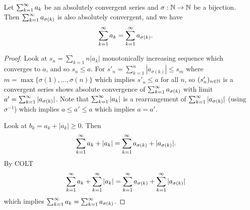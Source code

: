 \documentclass[10pt, a4paper]{article}
\newcommand{\seq}[1][x]{(#1_n)_{n \in \N}}
\begin{document}
\begin{theorem}
    Let $\infsum a_k$ be an absolutely convergent series and $\sigma : \N \rightarrow \N$ be a bijection.
    Then $\infsum a_{\sigma (k)}$ is also absolutely convergent,
    and we have
    \[
    \infsum a_k = \infsum a_{\sigma(k)}.
    \]
    \begin{proof}
        Look at $s_n = \sum_{k = 1}{n}|a_k|$ monotonically increasing sequence which converges to $a$,
        and so $s_n \leq a$.
        For $s'_n = \sum_{k = 1}^{n}|a_{\sigma(k)}| \leq s_m$ where $m = \max\{\sigma(1), \dotsc, \sigma(n)\}$ which implies $s'_n \leq a$ for all $n$,
        so $\seq[s']$ is a convergent series shows absolute convergence of $\infsum a_{\sigma(k)}$ with limit $a' = \infsum|a_{\sigma(k)}|$.
        Note that $\infsum|a_k|$ is a rearrangement of $\infsum|a_{\sigma(k)}|$
        (using $\sigma ^ {-1}$) which implies $a \leq a' \leq a$ which implies $a = a'$.

        Look at $b_k = a_k + |a_k| \geq 0$.
        Then
        \[
        \infsum a_k + |a_k| = \infsum a_{\sigma(k)} + |a_{\sigma(k)}|.
        \]
        By COLT
        \[
        \infsum a_k + \infsum|a_k| = \infsum a_{\sigma(k)} + \infsum|a_{\sigma(k)}|
        \]
        which implies $\infsum[k = 1]a_k = \infsum a_{\sigma(k)}$.
    \end{proof}
\end{theorem}
\end{document}

